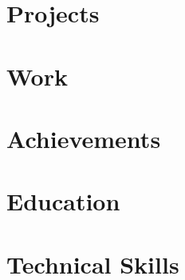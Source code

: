 \documentclass[12pt, a4paper, sans, obeyspaces, unicode]{moderncv}
\begin{document}
\maketitle

\vspace{0.5cm}

\section{Projects}

    


\section{Work}

    

\section{Achievements}

    



\section{Education}

    


%    

\section{Technical Skills}

    
\end{document}
